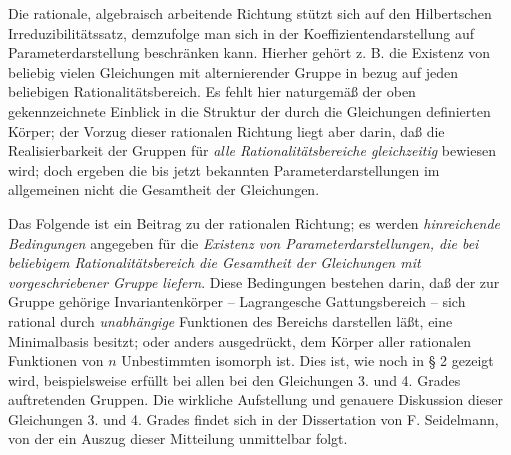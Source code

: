 Die \glqq{}rationale\grqq{}, algebraisch arbeitende Richtung stützt sich auf den Hilbertschen Irreduzibilitätssatz, demzufolge man sich in der Koeffizientendarstellung auf Parameterdarstellung beschränken kann. Hierher gehört z. B. die Existenz von beliebig vielen Gleichungen mit alternierender Gruppe in bezug auf jeden beliebigen Rationalitätsbereich. Es fehlt hier naturgemäß der oben gekennzeichnete Einblick in die Struktur der durch die Gleichungen definierten Körper; der Vorzug dieser \glqq{}rationalen\grqq{} Richtung liegt aber darin, daß die Realisierbarkeit der Gruppen für \emph{alle Rationalitätsbereiche gleichzeitig} bewiesen wird; doch ergeben die bis jetzt bekannten Parameterdarstellungen im allgemeinen nicht die Gesamtheit der Gleichungen. 

Das Folgende ist ein Beitrag zu der \glqq{}rationalen\grqq{} Richtung; es werden \emph{hinreichende Bedingungen} angegeben für die \emph{Existenz von Parameterdarstellungen, die bei beliebigem Rationalitätsbereich die Gesamtheit der Gleichungen mit vorgeschriebener Gruppe liefern}. Diese Bedingungen bestehen darin, daß der zur Gruppe gehörige Invariantenkörper -- Lagrangesche Gattungsbereich -- sich rational durch \emph{unabhängige} Funktionen des Bereichs darstellen läßt, eine \glqq{}Minimalbasis\grqq{} besitzt; oder anders ausgedrückt, dem Körper aller rationalen Funktionen von $n$ Unbestimmten isomorph ist. Dies ist, wie noch in § 2 gezeigt wird, beispielsweise erfüllt bei allen bei den Gleichungen 3. und 4. Grades auftretenden Gruppen. Die wirkliche Aufstellung und genauere Diskussion dieser Gleichungen 3. und 4. Grades findet sich in der Dissertation von F. Seidelmann, von der ein Auszug dieser Mitteilung unmittelbar folgt.

